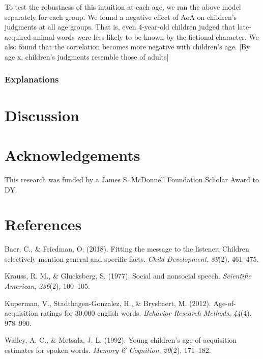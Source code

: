\documentclass[10pt, letterpaper]{article}
\begin{document}
To test the robustness of this intuition at each age, we ran the above
model separately for each group. We found a negative effect of AoA on
children's judgments at all age groups. That is, even 4-year-old
children judged that late-acquired animal words were less likely to be
known by the fictional character. We also found that the correlation
becomes more negative with children's age. {[}By age x, children's
judgments resemble those of adults{]}

\hypertarget{explanations}{%
\subsubsection{Explanations}\label{explanations}}

\hypertarget{discussion}{%
\section{Discussion}\label{discussion}}

\vspace{1em} 

\hypertarget{acknowledgements}{%
\section{Acknowledgements}\label{acknowledgements}}

This research was funded by a James S. McDonnell Foundation Scholar
Award to DY.

\hypertarget{references}{%
\section{References}\label{references}}

\setlength{\parindent}{-0.1in} 
\setlength{\leftskip}{0.125in}

\noindent

\hypertarget{refs}{}
\leavevmode\hypertarget{ref-baer2018}{}%
Baer, C., \& Friedman, O. (2018). Fitting the message to the listener:
Children selectively mention general and specific facts. \emph{Child
Development}, \emph{89}(2), 461--475.

\leavevmode\hypertarget{ref-krauss1977}{}%
Krauss, R. M., \& Glucksberg, S. (1977). Social and nonsocial speech.
\emph{Scientific American}, \emph{236}(2), 100--105.

\leavevmode\hypertarget{ref-kuperman2012}{}%
Kuperman, V., Stadthagen-Gonzalez, H., \& Brysbaert, M. (2012).
Age-of-acquisition ratings for 30,000 english words. \emph{Behavior
Research Methods}, \emph{44}(4), 978--990.

\leavevmode\hypertarget{ref-walley1992}{}%
Walley, A. C., \& Metsala, J. L. (1992). Young children's
age-of-acquisition estimates for spoken words. \emph{Memory \&
Cognition}, \emph{20}(2), 171--182.


\end{document}
